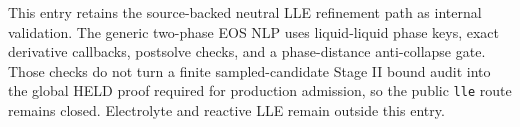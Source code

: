 \documentclass[12pt, letterpaper]{article}
\begin{document}

This entry retains the source-backed neutral LLE refinement path as internal
validation. The generic two-phase EOS NLP uses liquid-liquid phase keys, exact
derivative callbacks, postsolve checks, and a phase-distance anti-collapse
gate. Those checks do not turn a finite sampled-candidate Stage II bound audit
into the global HELD proof required for production admission, so the public
\texttt{lle} route remains closed. Electrolyte and reactive LLE remain outside
this entry.
\end{document}
